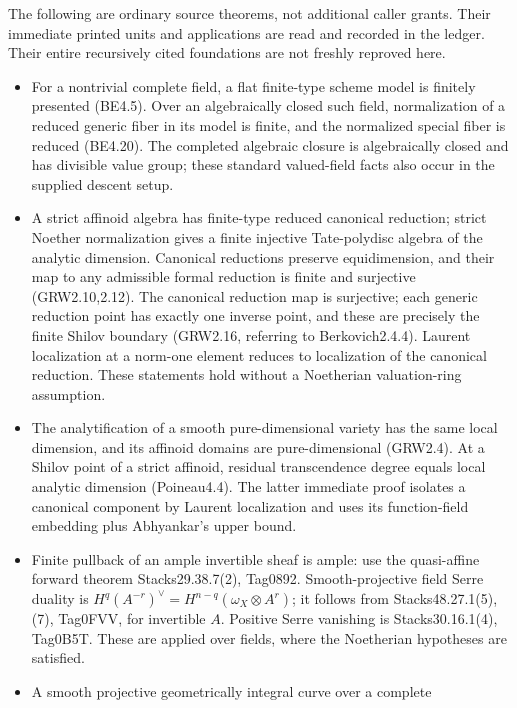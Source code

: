 \documentclass[
  11pt,
]{article}
\providecommand{\tightlist}{%
  \setlength{\itemsep}{0pt}\setlength{\parskip}{0pt}}
\begin{document}
The following are ordinary source theorems, not additional caller
grants. Their immediate printed units and applications are read and
recorded in the ledger. Their entire recursively cited foundations are
not freshly reproved here.

\begin{itemize}
\tightlist
\item
  For a nontrivial complete field, a flat finite-type scheme model is
  finitely presented (BE4.5). Over an algebraically closed such field,
  normalization of a reduced generic fiber in its model is finite, and
  the normalized special fiber is reduced (BE4.20). The completed
  algebraic closure is algebraically closed and has divisible value
  group; these standard valued-field facts also occur in the supplied
  descent setup.
\item
  A strict affinoid algebra has finite-type reduced canonical reduction;
  strict Noether normalization gives a finite injective Tate-polydisc
  algebra of the analytic dimension. Canonical reductions preserve
  equidimension, and their map to any admissible formal reduction is
  finite and surjective (GRW2.10,2.12). The canonical reduction map is
  surjective; each generic reduction point has exactly one inverse
  point, and these are precisely the finite Shilov boundary (GRW2.16,
  referring to Berkovich2.4.4). Laurent localization at a norm-one
  element reduces to localization of the canonical reduction. These
  statements hold without a Noetherian valuation-ring assumption.
\item
  The analytification of a smooth pure-dimensional variety has the same
  local dimension, and its affinoid domains are pure-dimensional
  (GRW2.4). At a Shilov point of a strict affinoid, residual
  transcendence degree equals local analytic dimension (Poineau4.4). The
  latter immediate proof isolates a canonical component by Laurent
  localization and uses its function-field embedding plus Abhyankar's
  upper bound.
\item
  Finite pullback of an ample invertible sheaf is ample: use the
  quasi-affine forward theorem Stacks29.38.7(2), Tag0892.
  Smooth-projective field Serre duality is
  \(H^q(A^{-r})^\vee=H^{n-q}(\omega_X\otimes A^r)\); it follows from
  Stacks48.27.1(5),(7), Tag0FVV, for invertible \(A\). Positive Serre
  vanishing is Stacks30.16.1(4), Tag0B5T. These are applied over fields,
  where the Noetherian hypotheses are satisfied.
\item
  A smooth projective geometrically integral curve over a complete

\end{itemize}
\end{document}
